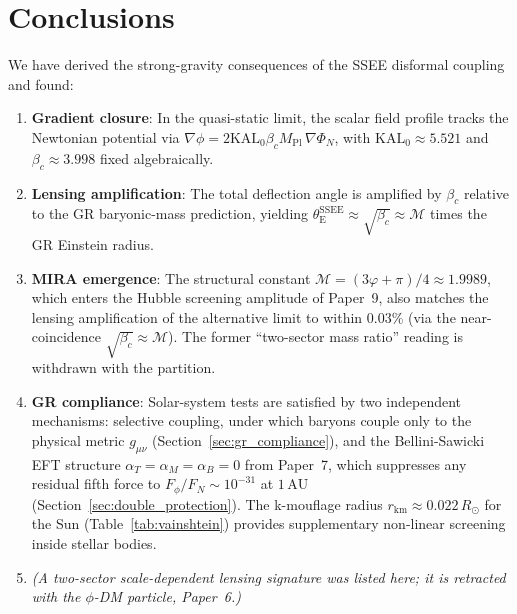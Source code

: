 \documentclass[12pt,a4paper]{article}
\newcommand{\phiG}{\varphi}
\newcommand{\KAL}{\mathrm{KAL}_0}
\newcommand{\MIRA}{\mathcal{M}}
\newcommand{\Mpl}{M_{\mathrm{Pl}}}
\newcommand{\bc}{\beta_c}
\newcommand{\rV}{r_{\mathrm{km}}}
\newcommand{\thetaE}{\theta_{\mathrm{E}}}
\newcommand{\alphaT}{\alpha_T}
\newcommand{\alphaM}{\alpha_M}
\begin{document}
\section{Conclusions}
\label{sec:conclusions}

We have derived the strong-gravity consequences of the SSEE disformal
coupling and found:

\begin{enumerate}
  \item \textbf{Gradient closure}: In the quasi-static limit, the scalar
        field profile tracks the Newtonian potential via
        $\nabla\phi = 2\KAL\bc\Mpl\,\nabla\Phi_N$, with
        $\KAL \approx 5.521$ and $\bc \approx 3.998$ fixed algebraically.

  \item \textbf{Lensing amplification}: The total deflection angle is
        amplified by $\bc$ relative to the GR baryonic-mass prediction,
        yielding $\thetaE^{\mathrm{SSEE}} \approx \sqrt{\bc} \approx \MIRA$
        times the GR Einstein radius.

  \item \textbf{MIRA emergence}: The structural constant
        $\MIRA = (3\phiG+\pi)/4 \approx 1.9989$, which enters the Hubble
        screening amplitude of Paper~9, also matches the lensing
        amplification of the alternative limit to within $0.03\%$ (via the
        near-coincidence $\sqrt{\bc} \approx \MIRA$). The former ``two-sector
        mass ratio'' reading is withdrawn with the partition.

  \item \textbf{GR compliance}: Solar-system tests are satisfied by two
        independent mechanisms: selective coupling, under which baryons
        couple only to the physical metric $g_{\mu\nu}$
        (Section~\ref{sec:gr_compliance}), and the Bellini-Sawicki EFT
        structure $\alphaT = \alphaM = \alpha_B = 0$ from Paper~7, which
        suppresses any residual fifth force to $F_\phi/F_N \sim 10^{-31}$
        at $1\,\mathrm{AU}$ (Section~\ref{sec:double_protection}).
        The k-mouflage radius $\rV \approx 0.022\,R_\odot$ for the Sun
        (Table~\ref{tab:vainshtein}) provides supplementary non-linear
        screening inside stellar bodies.

  \item \emph{(A two-sector scale-dependent lensing signature was listed here;
        it is retracted with the $\phi$-DM particle, Paper~6.)}
\end{enumerate}
\end{document}
